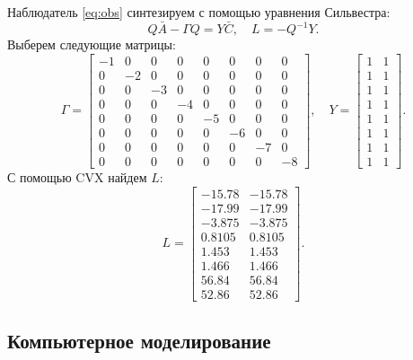 Наблюдатель \eqref{eq:obs} синтезируем с помощью уравнения Сильвестра:
\begin{equation*}
    Q\bar A-\Gamma Q=Y\bar C,\quad L=-Q^{-1}Y.
\end{equation*}
Выберем следующие матрицы:
\begin{equation*}
    \Gamma=\begin{bmatrix}
        -1 & 0 & 0 & 0 & 0 & 0 & 0 & 0\\
        0 & -2 & 0 & 0 & 0 & 0 & 0 & 0\\
        0 & 0 & -3 & 0 & 0 & 0 & 0 & 0\\
        0 & 0 & 0 & -4 & 0 & 0 & 0 & 0\\
        0 & 0 & 0 & 0 & -5 & 0 & 0 & 0\\
        0 & 0 & 0 & 0 & 0 & -6 & 0 & 0\\
        0 & 0 & 0 & 0 & 0 & 0 & -7 & 0\\
        0 & 0 & 0 & 0 & 0 & 0 & 0 & -8
    \end{bmatrix},\quad
    Y=\begin{bmatrix}
1 & 1\\
1 & 1\\
1 & 1\\
1 & 1\\
1 & 1\\
1 & 1\\
1 & 1\\
1 & 1
    \end{bmatrix}.
\end{equation*}
С помощью CVX найдем $L$:
\begin{equation*}
    L=\begin{bmatrix}
-15.78 & -15.78\\
-17.99 & -17.99\\
-3.875 & -3.875\\
0.8105 & 0.8105\\
1.453 & 1.453\\
1.466 & 1.466\\
56.84 & 56.84\\
52.86 & 52.86
    \end{bmatrix}.
\end{equation*}

\subsection{Компьютерное моделирование}

